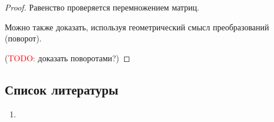 \begin{proof}
  Равенство проверяется перемножением матриц.

  Можно также доказать, используя геометрический смысл преобразований (поворот).

  (\textcolor{red}{TODO:} доказать поворотами?)
\end{proof}

\subsection{Список литературы}
\begin{enumerate}
  \item \cite{lourie}
\end{enumerate}

